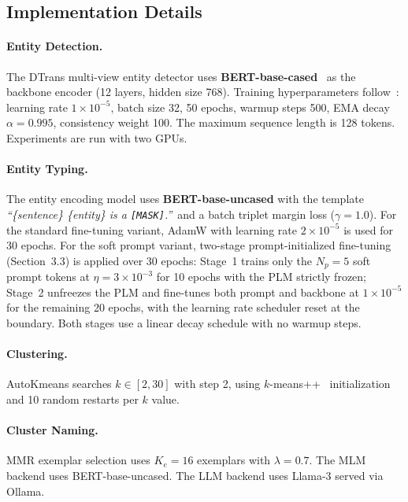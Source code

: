 \documentclass[14pt]{extreport}
\begin{document}
\FloatBarrier

\subsection{Implementation Details}

\paragraph{Entity Detection.}
The DTrans multi-view entity detector uses \textbf{BERT-base-cased}~\cite{devlin-etal-2019-bert} as the backbone encoder (12 layers, hidden size 768). Training hyperparameters follow~\cite{zhang-etal-2024-dtrans}: learning rate $1\times10^{-5}$, batch size 32, 50 epochs, warmup steps 500, EMA decay $\alpha = 0.995$, consistency weight 100. The maximum sequence length is 128 tokens. Experiments are run with two GPUs.

\paragraph{Entity Typing.}
The entity encoding model uses \textbf{BERT-base-uncased} with the template \emph{``\{sentence\} \{entity\} is a \texttt{[MASK]}.''}\ and a batch triplet margin loss ($\gamma = 1.0$). For the standard fine-tuning variant, AdamW with learning rate $2\times10^{-5}$ is used for 30 epochs. For the soft prompt variant, two-stage prompt-initialized fine-tuning (Section~3.3) is applied over 30 epochs: Stage~1 trains only the $N_p = 5$ soft prompt tokens at $\eta = 3\times10^{-3}$ for 10 epochs with the PLM strictly frozen; Stage~2 unfreezes the PLM and fine-tunes both prompt and backbone at $1\times10^{-5}$ for the remaining 20 epochs, with the learning rate scheduler reset at the boundary. Both stages use a linear decay schedule with no warmup steps.

\paragraph{Clustering.}
AutoKmeans searches $k \in [2, 30]$ with step 2, using $k$-means++~\cite{arthur-vassilvitskii-2007-kmeanspp} initialization and 10 random restarts per $k$ value.

\paragraph{Cluster Naming.}
MMR exemplar selection uses $K_e = 16$ exemplars with $\lambda = 0.7$. The MLM backend uses BERT-base-uncased. The LLM backend uses Llama-3 served via Ollama.
\end{document}
